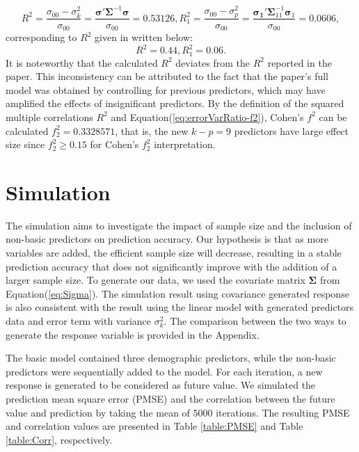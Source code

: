 $$R^2 = \frac{\sigma_{00}-\sigma^2_k}{\sigma_{00}} = \frac{\boldsymbol{\sigma}' \boldsymbol{\Sigma}^{-1} \boldsymbol{\sigma}}{\sigma_{00}} = 0.53126, 
R_1^2 = \frac{\sigma_{00}-\sigma^2_p}{\sigma_{00}} = \frac{\boldsymbol{\sigma_1}' \boldsymbol{\Sigma}_{11}^{-1} \boldsymbol{\sigma}_1}{\sigma_{00}} = 0.0606,$$
corresponding to $R^2$ given in \cite{baker2008chronicpain} written below:
$$R^2 = 0.44, R_1^2 = 0.06.$$
It is noteworthy that the calculated $R^2$ deviates from the $R^2$ reported in the paper. This inconsistency can be attributed to the fact that the paper's full model was obtained by controlling for previous predictors, which may have amplified the effects of insignificant predictors. By the definition of the squared multiple correlations $R^2$ and Equation(\ref{eq:errorVarRatio-f2}), Cohen's $f^2$ can be calculated $f_2^2 = 0.3328571$, that is, the new $k-p = 9$ predictors have large effect size since $f_2^2 \ge 0.15$ for Cohen's $f_2^2$ interpretation.




\section{Simulation}

The simulation aims to investigate the impact of sample size and the inclusion of non-basic predictors on prediction accuracy.  Our hypothesis is that as more variables are added, the efficient sample size will decrease, resulting in a stable prediction accuracy that does not significantly improve with the addition of a larger sample size. To generate our data, we used the covariate matrix $\boldsymbol{\Sigma}$ from Equation(\ref{eq:Sigma}). The simulation result using covariance generated response is also consistent with the result using the linear model with generated predictors data and error term with variance $\sigma_k^2$. The comparison between the two ways to generate the response variable is provided in the Appendix.

The basic model contained three demographic predictors, while the non-basic predictors were sequentially added to the model. For each iteration, a new response is generated to be considered as future value. We simulated the prediction mean square error (PMSE) and the correlation between the future value and prediction by taking the mean of 5000 iterations. The resulting PMSE and correlation values are presented in Table \ref{table:PMSE} and Table \ref{table:Corr}, respectively.



